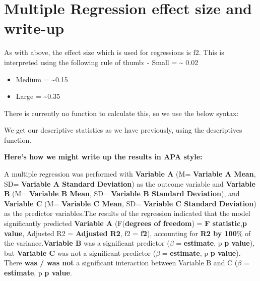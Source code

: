 \documentclass[
]{book}
\newenvironment{Shaded}{\begin{snugshade}}{\end{snugshade}}
\newcommand{\CommentTok}[1]{\textcolor[rgb]{0.56,0.35,0.01}{\textit{#1}}}
\newcommand{\DecValTok}[1]{\textcolor[rgb]{0.00,0.00,0.81}{#1}}
\newcommand{\NormalTok}[1]{#1}
\newcommand{\OtherTok}[1]{\textcolor[rgb]{0.56,0.35,0.01}{#1}}
\newcommand{\SpecialCharTok}[1]{\textcolor[rgb]{0.81,0.36,0.00}{\textbf{#1}}}
\begin{document}
\section{Multiple Regression effect size and write-up}\label{multiple-regression-effect-size-and-write-up}

As with above, the effect size which is used for regressions is f2. This is interpreted using the following rule of thumb: - Small = \textasciitilde{} 0.02

\begin{itemize}
\item
  Medium = \textasciitilde0.15
\item
  Large = \textasciitilde0.35
\end{itemize}

There is currently no function to calculate this, so we use the below syntax:

\begin{Shaded}
\end{Shaded}

We get our descriptive statistics as we have previously, using the descriptives function.

\textbf{Here's how we might write up the results in APA style:}

A multiple regression was performed with \textbf{Variable A} (M= \textbf{Variable A Mean}, SD= \textbf{Variable A Standard Deviation}) as the outcome variable and \textbf{Variable B} (M= \textbf{Variable B Mean}, SD= \textbf{Variable B Standard Deviation}), and \textbf{Variable C} (M= \textbf{Variable C Mean}, SD= \textbf{Variable C Standard Deviation}) as the predictor variables.The results of the regression indicated that the model significantly predicted \textbf{Variable A} (F(\textbf{degrees of freedom}) = \textbf{F statistic},\textbf{p value}, Adjusted R2 = \textbf{Adjusted R2}, f2 = \textbf{f2}), accounting for \textbf{R2 by 100}\% of the variance.\textbf{Variable B} was a significant predictor (\(\beta\) = \textbf{estimate}, p \textbf{p value}), but \textbf{Variable C} was not a significant predictor (\(\beta\) = \textbf{estimate}, p \textbf{p value}). There \textbf{was / was not} a significant interaction between Variable B and C (\(\beta\) = \textbf{estimate}, p \textbf{p value}.

\section{}\label{section}

  
\end{document}
